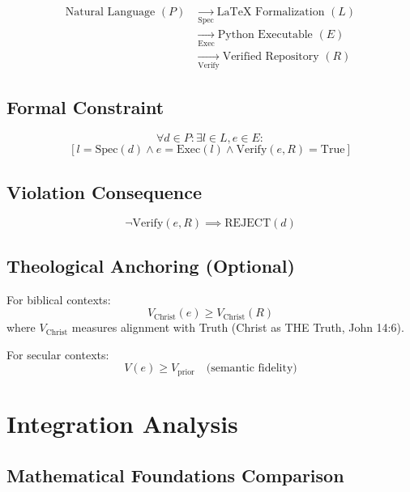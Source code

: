 \documentclass[12pt]{article}
\begin{document}
\begin{align*}
\text{Natural Language } (P) & \xrightarrow[\text{Spec}]{} \text{LaTeX Formalization } (L) \\
& \xrightarrow[\text{Exec}]{} \text{Python Executable } (E) \\
& \xrightarrow[\text{Verify}]{} \text{Verified Repository } (R)
\end{align*}

\subsection{Formal Constraint}

\begin{definition}
\[
\forall d \in P: \exists l \in L, e \in E:
\]
\[
[l = \text{Spec}(d) \land e = \text{Exec}(l) \land \text{Verify}(e, R) = \text{True}]
\]
\end{definition}

\subsection{Violation Consequence}

\begin{theorem}
\[
\neg \text{Verify}(e, R) \implies \text{REJECT}(d)
\]
\end{theorem}

\subsection{Theological Anchoring (Optional)}

\begin{definition}
For biblical contexts:
\[
V_{\text{Christ}}(e) \geq V_{\text{Christ}}(R)
\]
where $V_{\text{Christ}}$ measures alignment with Truth (Christ as THE Truth, John 14:6).

For secular contexts:
\[
V(e) \geq V_{\text{prior}} \quad \text{(semantic fidelity)}
\]
\end{definition}

\section{Integration Analysis}

\subsection{Mathematical Foundations Comparison}
\end{document}
